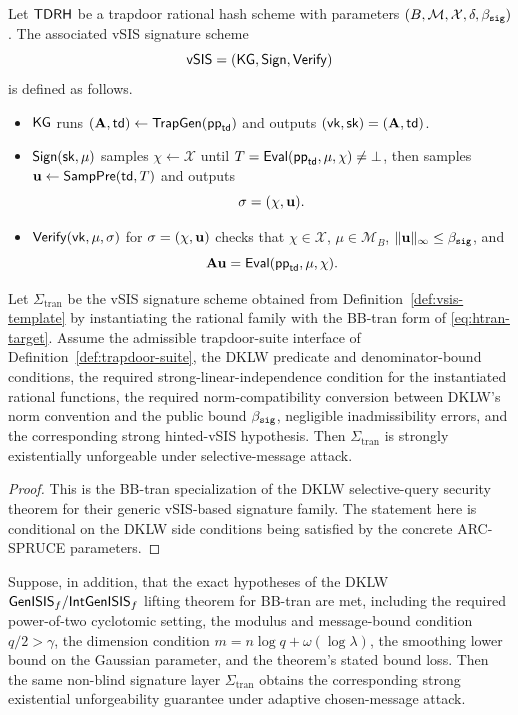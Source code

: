 \begin{definition}\label{def:vsis-template}
Let $\mathsf{TDRH}$ be a trapdoor rational hash scheme with parameters
$(B,\mathcal M,\mathcal X,\delta,\beta_{\mathtt{sig}})$.  The associated vSIS signature scheme
\[
  \mathsf{vSIS}=(\mathsf{KG},\mathsf{Sign},\mathsf{Verify})
\]
is defined as follows.
\begin{itemize}[leftmargin=1.25em]
  \item $\mathsf{KG}$ runs $(\mathbf{A},\mathsf{td})\gets\mathsf{TrapGen}(\mathsf{pp}_{\mathsf{td}})$ and outputs
  $(\mathsf{vk},\mathsf{sk})=(\mathbf{A},\mathsf{td})$.
  \item $\mathsf{Sign}(\mathsf{sk},\mu)$ samples $\chi\gets\mathcal X$ until $T=\mathsf{Eval}(\mathsf{pp}_{\mathsf{td}},\mu,\chi)\neq \bot$,
  then samples $\mathbf{u}\gets\mathsf{SampPre}(\mathsf{td},T)$ and outputs
  \[
    \sigma=(\chi,\mathbf{u}).
  \]
  \item $\mathsf{Verify}(\mathsf{vk},\mu,\sigma)$ for $\sigma=(\chi,\mathbf{u})$ checks that $\chi\in\mathcal X$,
  $\mu\in\mathcal M_B$, $\|\mathbf{u}\|_\infty\le \beta_{\mathtt{sig}}$, and
  \[
    \mathbf{A}\mathbf{u}=\mathsf{Eval}(\mathsf{pp}_{\mathsf{td}},\mu,\chi).
  \]
\end{itemize}
\end{definition}

\begin{theorem}\label{thm:dkwl-seuf-sma}
Let $\Sigma_{\mathrm{tran}}$ be the vSIS signature scheme obtained from Definition~\ref{def:vsis-template} by
instantiating the rational family with the BB-tran form of \eqref{eq:htran-target}.  Assume the admissible
trapdoor-suite interface of Definition~\ref{def:trapdoor-suite}, the DKLW predicate and denominator-bound
conditions, the required strong-linear-independence condition for the instantiated rational functions, the
required norm-compatibility conversion between DKLW's norm convention and the public bound
$\beta_{\mathtt{sig}}$, negligible inadmissibility errors, and the corresponding strong hinted-vSIS hypothesis.  Then
$\Sigma_{\mathrm{tran}}$ is strongly existentially unforgeable under selective-message attack.
\end{theorem}

\begin{proof}
This is the BB-tran specialization of the DKLW selective-query security theorem for their generic
vSIS-based signature family.  The statement here is conditional on the DKLW side conditions being
satisfied by the concrete ARC-SPRUCE parameters.
\end{proof}

\begin{corollary}\label{cor:dkwl-seuf-cma}
Suppose, in addition, that the exact hypotheses of the DKLW $\mathsf{GenISIS}_f/\mathsf{IntGenISIS}_f$ lifting theorem
for BB-tran are met, including the required power-of-two cyclotomic setting, the modulus and message-bound
condition $q/2>\gamma$, the dimension condition $m=n\log q+\omega(\log\lambda)$, the smoothing lower
bound on the Gaussian parameter, and the theorem's stated bound loss.  Then the same non-blind
signature layer $\Sigma_{\mathrm{tran}}$ obtains the corresponding strong existential unforgeability guarantee
under adaptive chosen-message attack.
\end{corollary}

